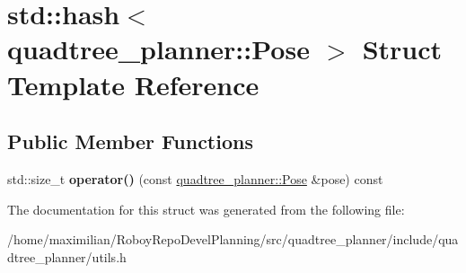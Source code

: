 \hypertarget{structstd_1_1hash_3_01quadtree__planner_1_1Pose_01_4}{}\section{std\+:\+:hash$<$ quadtree\+\_\+planner\+:\+:Pose $>$ Struct Template Reference}
\label{structstd_1_1hash_3_01quadtree__planner_1_1Pose_01_4}
\subsection*{Public Member Functions}
\begin{DoxyCompactItemize}
\item 
\mbox{\label{structstd_1_1hash_3_01quadtree__planner_1_1Pose_01_4_ac8874e34eca4fed9febfd628fb97b495}} 
std\+::size\+\_\+t {\bfseries operator()} (const \hyperlink{structquadtree__planner_1_1Pose}{quadtree\+\_\+planner\+::\+Pose} \&pose) const
\end{DoxyCompactItemize}


The documentation for this struct was generated from the following file\+:\begin{DoxyCompactItemize}
\item 
/home/maximilian/\+Roboy\+Repo\+Devel\+Planning/src/quadtree\+\_\+planner/include/quadtree\+\_\+planner/utils.\+h\end{DoxyCompactItemize}
